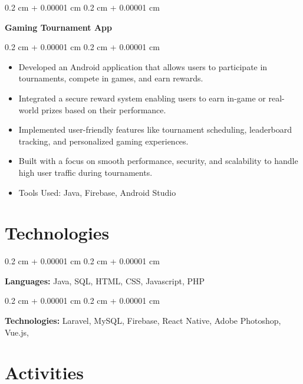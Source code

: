 \documentclass[10pt, letterpaper]{article}
\newenvironment{highlights}{
    \begin{itemize}[
        topsep=0.10 cm,
        parsep=0.10 cm,
        partopsep=0pt,
        itemsep=0pt,
        leftmargin=0.4 cm + 10pt
    ]
}{
    \end{itemize}
} %
\newenvironment{onecolentry}{
    \begin{adjustwidth}{
        0.2 cm + 0.00001 cm
    }{
        0.2 cm + 0.00001 cm
    }
}{
    \end{adjustwidth}
} %
\begin{document}
        \vspace{0.2 cm}

        \begin{onecolentry}
            \textbf{Gaming Tournament App}
        \end{onecolentry}

        \vspace{0.10 cm}
        \begin{onecolentry}
            \begin{highlights}
                \item Developed an Android application that allows users to participate in tournaments, compete in games, and earn rewards.
                \item Integrated a secure reward system enabling users to earn in-game or real-world prizes based on their performance.
                \item Implemented user-friendly features like tournament scheduling, leaderboard tracking, and personalized gaming experiences.
                \item Built with a focus on smooth performance, security, and scalability to handle high user traffic during tournaments.
                \item Tools Used: Java, Firebase, Android Studio
            \end{highlights}
        \end{onecolentry}



    
    \section{Technologies}



        
        \begin{onecolentry}
            \textbf{Languages:} Java, SQL, HTML, CSS, Javascript, PHP
        \end{onecolentry}

        \vspace{0.2 cm}

        \begin{onecolentry}
            \textbf{Technologies:} Laravel, MySQL, Firebase, React Native, Adobe Photoshop, Vue.js,
        \end{onecolentry}


    
    \section{Activities}
\end{document}
